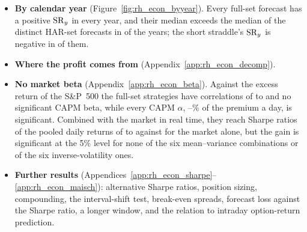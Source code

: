 \begin{itemize}
  \rhrAfPoolDShMin{} to \rhrAfPoolDShMax, and the gain is significant at the 5\% level for \rhemFullVsHarSigWord{} of
  the six (Ledoit--Wolf test). For the three linear classes the comparator is the benchmark forecast itself; their
  gains, \rhemDShRidgeFullVsHar,
  \rhemDShLassoFullVsHar{} and \rhemDShEnetFullVsHar{} for the ridge, lasso and elastic net, have Ledoit--Wolf
  $p$-values of \rhemPDShRidgeFullVsHar, \rhemPDShLassoFullVsHar{} and \rhemPDShEnetFullVsHar.
\item \textbf{By calendar year} (Figure~\ref{fig:rh_econ_byyear}). Every full-set forecast has a positive $\mathrm{SR}_y$ in
  every year, and their median exceeds the median of the \rhemHarDistinctWord{} distinct HAR-set forecasts in
  \rhemYearsFullMedAboveHarMedWord{} of the \rhemNYearsWord{} years; the short straddle's $\mathrm{SR}_y$ is negative in
  \rhemYearsShortNegWord{} of them.
\item \textbf{Where the profit comes from} (Appendix~\ref{app:rh_econ_decomp}).
\item \textbf{No market beta} (Appendix~\ref{app:rh_econ_beta}). Against the excess return of the S\&P~500 the
  full-set strategies have correlations of \rhebCorrFullMin{} to \rhebCorrFullMax{} and no significant CAPM beta,
  while every CAPM $\alpha$, \rhebAlphaFullMin--\rhebAlphaFullMax\% of the premium a day, is significant. Combined with
  the market in real time, they reach Sharpe ratios of the pooled daily returns of \rhebRtMvFullMin{} to
  \rhebRtMvFullMax{} against \rhebSRmRt{} for the market alone, but the gain is significant at the 5\% level for none
  of the six mean--variance combinations or of the six inverse-volatility ones.
\item \textbf{Further results} (Appendices~\ref{app:rh_econ_sharpe}--\ref{app:rh_econ_maisch}): alternative Sharpe
  ratios, position sizing, compounding, the interval-shift test, break-even spreads, forecast loss against the Sharpe
  ratio, a longer window, and the relation to intraday option-return prediction.
\end{itemize}

